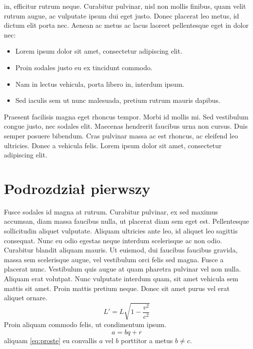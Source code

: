 \documentclass[polish,engineering]{wizthesis}
\begin{document}
in, efficitur rutrum neque. Curabitur pulvinar, nisl non mollis finibus, quam
velit rutrum augue, ac vulputate ipsum dui eget justo. Donec placerat leo metus,
id dictum elit porta nec. Aenean ac metus ac lacus laoreet pellentesque eget in
dolor \cite[chap. 2]{latexcompanion} nec:
\begin{itemize}[noitemsep]
  \item Lorem ipsum dolor sit amet, consectetur adipiscing elit.
  \item Proin sodales justo eu ex tincidunt commodo.
  \item Nam in lectus vehicula, porta libero in, interdum ipsum.
  \item Sed iaculis sem ut nunc malesuada, pretium rutrum mauris dapibus.
\end{itemize}
Praesent facilisis magna eget rhoncus tempor. Morbi id mollis mi. Sed vestibulum
congue justo, nec sodales elit. Maecenas hendrerit faucibus urna non cursus.
Duis semper posuere bibendum. Cras pulvinar massa ac est rhoncus, ac eleifend
leo ultricies. Donec a vehicula felis. Lorem ipsum dolor sit amet, consectetur
adipiscing elit.

\section{Podrozdział pierwszy}

Fusce sodales id magna at rutrum. Curabitur pulvinar, ex sed maximus accumsan,
diam massa faucibus nulla, ut placerat diam sem eget est. Pellentesque
sollicitudin aliquet vulputate. Aliquam ultricies ante leo, id aliquet leo
sagittis consequat. Nunc eu odio egestas neque interdum scelerisque ac non odio.
Curabitur blandit aliquam mauris. Ut euismod, dui faucibus faucibus gravida,
massa sem scelerisque augue, vel vestibulum orci felis sed magna. Fusce a
placerat nunc. Vestibulum quis augue at quam pharetra pulvinar vel non nulla.
Aliquam erat volutpat. Nunc vulputate interdum quam, sit amet vehicula sem
mattis sit amet. Proin mattis pretium neque. Donec sit amet purus vel erat
aliquet \cite{einstein} ornare.
\begin{equation} \label{eq:skomplikowane}
  L' = {L}{\sqrt{1-\frac{v^2}{c^2}}}
\end{equation}
Proin aliquam commodo felis, ut condimentum ipsum.
\begin{equation} \label{eq:proste}
  a = bq + r
\end{equation}
aliquam \eqref{eq:proste} eu convallis $a$ vel $b$ porttitor a metus $b \neq c$.
\end{document}
